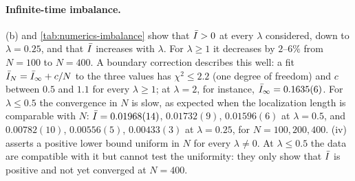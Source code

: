 \paragraph{Infinite-time imbalance.}  (b) and \cref{tab:numerics-imbalance} show that $\bar I>0$
at every $\lambda$ considered, down to $\lambda=0.25$, and that $\bar I$ increases with $\lambda$.  For $\lambda\ge1$ it
decreases by $2$--$6\%$ from $N=100$ to $N=400$.  A boundary correction describes this well: a fit
$\bar I_N=\bar I_\infty+c/N$ to the three values has $\chi^2\le2.2$ (one degree of freedom) and $c$ between $0.5$ and
$1.1$ for every $\lambda\ge1$; at $\lambda=2$, for instance, $\bar I_\infty=0.1635(6)$.  For $\lambda\le0.5$ the convergence in $N$ is slow, as expected when the localization
length is comparable with $N$: $\bar I=0.01968(14)$, $0.01732(9)$, $0.01596(6)$ at $\lambda=0.5$, and
$0.00782(10)$, $0.00556(5)$, $0.00433(3)$ at $\lambda=0.25$, for $N=100,200,400$.  (iv) asserts a
positive lower bound uniform in $N$ for every $\lambda\neq0$.  At $\lambda\le0.5$ the data are compatible with it but
cannot test the uniformity: they only show that $\bar I$ is positive and not yet converged at $N=400$.

